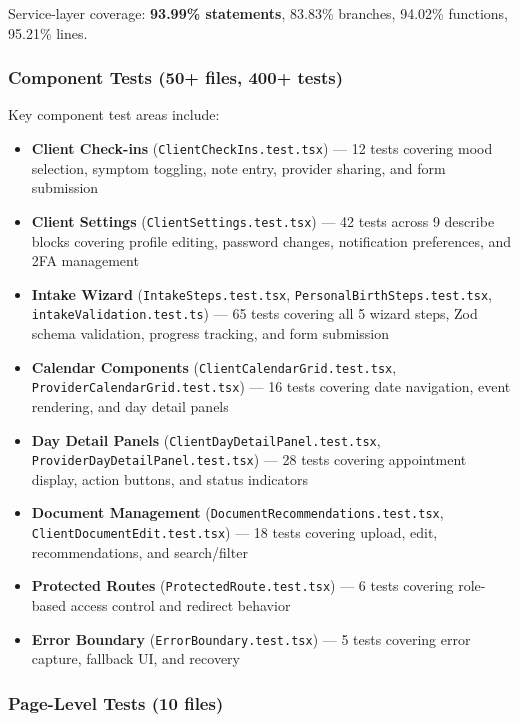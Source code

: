 \documentclass[12pt,letterpaper]{article}
\begin{document}
Service-layer coverage: \textbf{93.99\% statements}, 83.83\% branches, 94.02\% functions, 95.21\% lines.

\subsubsection{Component Tests (50+ files, 400+ tests)}

Key component test areas include:

\begin{itemize}[nosep]
  \item \textbf{Client Check-ins} (\texttt{ClientCheckIns.test.tsx}) --- 12 tests covering mood selection, symptom toggling, note entry, provider sharing, and form submission
  \item \textbf{Client Settings} (\texttt{ClientSettings.test.tsx}) --- 42 tests across 9 describe blocks covering profile editing, password changes, notification preferences, and 2FA management
  \item \textbf{Intake Wizard} (\texttt{IntakeSteps.test.tsx}, \texttt{PersonalBirthSteps.test.tsx}, \texttt{intakeValidation.test.ts}) --- 65 tests covering all 5 wizard steps, Zod schema validation, progress tracking, and form submission
  \item \textbf{Calendar Components} (\texttt{ClientCalendarGrid.test.tsx}, \texttt{ProviderCalendarGrid.test.tsx}) --- 16 tests covering date navigation, event rendering, and day detail panels
  \item \textbf{Day Detail Panels} (\texttt{ClientDayDetailPanel.test.tsx}, \texttt{ProviderDayDetailPanel.test.tsx}) --- 28 tests covering appointment display, action buttons, and status indicators
  \item \textbf{Document Management} (\texttt{DocumentRecommendations.test.tsx}, \texttt{ClientDocumentEdit.test.tsx}) --- 18 tests covering upload, edit, recommendations, and search/filter
  \item \textbf{Protected Routes} (\texttt{ProtectedRoute.test.tsx}) --- 6 tests covering role-based access control and redirect behavior
  \item \textbf{Error Boundary} (\texttt{ErrorBoundary.test.tsx}) --- 5 tests covering error capture, fallback UI, and recovery
\end{itemize}

\subsubsection{Page-Level Tests (10 files)}
\end{document}
